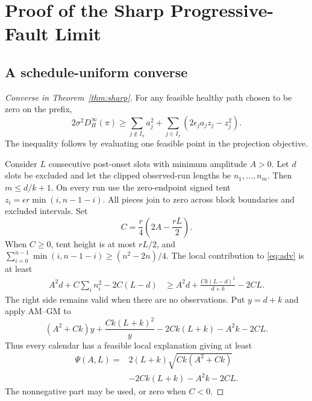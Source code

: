 \section{Proof of the Sharp Progressive-Fault Limit}
\subsection{A schedule-uniform converse}
\begin{proof}[Converse in Theorem~\ref{thm:sharp}]
For any feasible healthy path chosen to be zero on the prefix,
\begin{equation}
 2\sigma^2D_H^\infty(\pi)\ge
 \sum_{j\notin I_\pi}a_j^2+
 \sum_{j\in I_\pi}(2\epsilon_j a_jz_j-z_j^2).\label{eq:adv}
\end{equation}
The inequality follows by evaluating one feasible point in the projection objective.

Consider $L$ consecutive post-onset slots with minimum amplitude $A>0$. Let $d$ slots be excluded and let the clipped observed-run lengths be $n_1,\ldots,n_m$. Then $m\le d/k+1$. On every run use the zero-endpoint signed tent $z_i=\epsilon r\min(i,n-1-i)$. All pieces join to zero across block boundaries and excluded intervals. Set
\begin{equation}
 C=\frac r4\left(2A-\frac{rL}{2}\right).
\end{equation}
When $C\ge0$, tent height is at most $rL/2$, and
$\sum_{i=0}^{n-1}\min(i,n-1-i)\ge(n^2-2n)/4$. The local contribution to \eqref{eq:adv} is at least
\begin{align}
 A^2d+C\sum_i n_i^2-2C(L-d)
 &\ge A^2d+\frac{Ck(L-d)^2}{d+k}-2CL.\label{eq:macro1}
\end{align}
The right side remains valid when there are no observations. Put $y=d+k$ and apply AM--GM to
\begin{equation}
 (A^2+Ck)y+\frac{Ck(L+k)^2}{y}
 -2Ck(L+k)-A^2k-2CL.
\end{equation}
Thus every calendar has a feasible local explanation giving at least
\begin{equation}
 \begin{split}
 \Psi(A,L)={}&2(L+k)\sqrt{Ck(A^2+Ck)}\\
 &-2Ck(L+k)-A^2k-2CL.
\end{split}\label{eq:macro}
\end{equation}
The nonnegative part may be used, or zero when $C<0$.


\end{proof}
